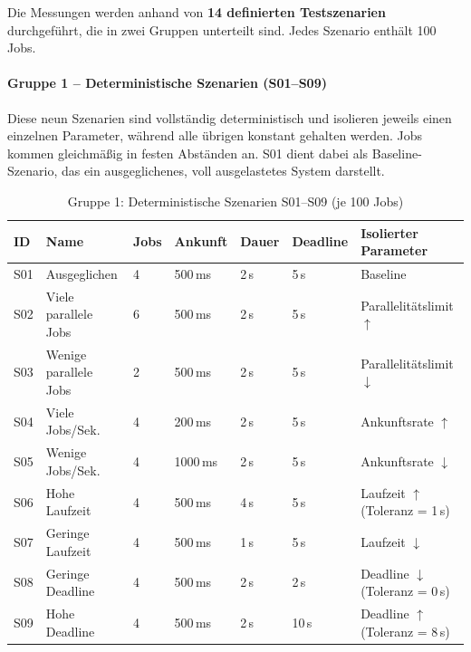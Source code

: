 \documentclass[
    12pt,               
    a4paper,            
    ngerman,            
    parskip=half,       
    headings=normal,   
    numbers=enddot,     
    toc=chapterentrywithdots 
]{scrreprt}\usepackage[utf8]{inputenc}
\begin{document}
Die Messungen werden anhand von \textbf{14 definierten Testszenarien} durchgeführt, die in zwei Gruppen unterteilt sind. Jedes Szenario enthält 100 Jobs.

\paragraph{Gruppe 1 -- Deterministische Szenarien (S01--S09)}
Diese neun Szenarien sind vollständig deterministisch und isolieren jeweils einen einzelnen Parameter, während alle übrigen konstant gehalten werden. Jobs kommen gleichmäßig in festen Abständen an. S01 dient dabei als Baseline-Szenario, das ein ausgeglichenes, voll ausgelastetes System darstellt.

\begin{table}[H]
\centering
{\setlength{\arrayrulewidth}{0.3pt}
\begin{tabular}{|p{}|p{}|p{}|p{}|p{}|p{}|p{}|}
    \hline
    \textbf{ID} & \textbf{Name} & \textbf{Jobs} & \textbf{Ankunft} & \textbf{Dauer} & \textbf{Deadline} & \textbf{Isolierter Parameter} \\
    \hline
    S01 & Ausgeglichen         & 4 & 500\,ms  & 2\,s & 5\,s  & Baseline \\
    \hline
    S02 & Viele parallele Jobs & 6 & 500\,ms  & 2\,s & 5\,s  & Parallelitätslimit $\uparrow$ \\
    \hline
    S03 & Wenige parallele Jobs & 2 & 500\,ms  & 2\,s & 5\,s  & Parallelitätslimit $\downarrow$ \\
    \hline
    S04 & Viele Jobs/Sek.      & 4 & 200\,ms  & 2\,s & 5\,s  & Ankunftsrate $\uparrow$ \\
    \hline
    S05 & Wenige Jobs/Sek.     & 4 & 1000\,ms & 2\,s & 5\,s  & Ankunftsrate $\downarrow$ \\
    \hline
    S06 & Hohe Laufzeit        & 4 & 500\,ms  & 4\,s & 5\,s  & Laufzeit $\uparrow$ (Toleranz = 1\,s) \\
    \hline
    S07 & Geringe Laufzeit     & 4 & 500\,ms  & 1\,s & 5\,s  & Laufzeit $\downarrow$ \\
    \hline
    S08 & Geringe Deadline     & 4 & 500\,ms  & 2\,s & 2\,s  & Deadline $\downarrow$ (Toleranz = 0\,s) \\
    \hline
    S09 & Hohe Deadline        & 4 & 500\,ms  & 2\,s & 10\,s & Deadline $\uparrow$ (Toleranz = 8\,s) \\
    \hline
\end{tabular}}
\caption{Gruppe 1: Deterministische Szenarien S01--S09 (je 100 Jobs)}
\label{tab:szenarien_s01_s09}
\end{table}
\end{document}
